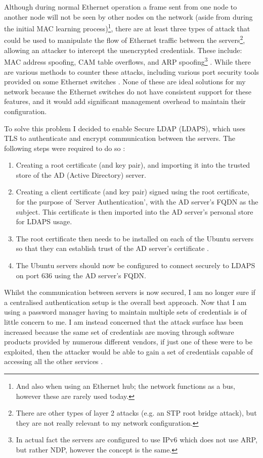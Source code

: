 \documentclass[11pt,a4paper]{scrartcl}
\begin{document}
\begin{refsection}
Although during normal Ethernet operation a frame sent from one node to another node will not be seen by other nodes on the network (aside from during the initial MAC learning process)\footnote{And also when using an Ethernet hub; the network functions as a bus, however these are rarely used today.}, there are at least three types of attack that could be used to manipulate the flow of Ethernet traffic between the servers\footnote{There are other types of layer 2 attacks (e.g. an STP root bridge attack), but they are not really relevant to my network configuration.}, allowing an attacker to intercept the unencrypted credentials.
These include: MAC address spoofing, CAM table overflows, and ARP spoofing\footnote{In actual fact the servers are configured to use IPv6 which does not use ARP, but rather NDP, however the concept is the same.} \cite{l2attacks}.
While there are various methods to counter these attacks, including various port security tools provided on some Ethernet switches \cite[193]{odom_icnd1}.
None of these are ideal solutions for my network because the Ethernet switches do not have consistent support for these features, and it would add significant management overhead to maintain their configuration.

To solve this problem I decided to enable Secure LDAP (LDAPS), which uses TLS to authenticate and encrypt communication between the servers. The following steps were required to do so \cite{microsoft_enable_ldaps, ad_ldaps_gist}:
\begin{enumerate}
	\item Creating a root certificate (and key pair), and importing it into the trusted store of the AD (Active Directory) server.
	\item Creating a client certificate (and key pair) signed using the root certificate, for the purpose of 'Server Authentication', with the AD server's FQDN as the subject. This certificate is then imported into the AD server's personal store for LDAPS usage.
	\item The root certificate then needs to be installed on each of the Ubuntu servers so that they can establish trust of the AD server's certificate \cite{ubuntu_ca_cert}.
	\item The Ubuntu servers should now be configured to connect securely to LDAPS on port 636 using the AD server's FQDN.
\end{enumerate}

Whilst the communication between servers is now secured, I am no longer sure if a centralised authentication setup is the overall best approach. Now that I am using a password manager having to maintain multiple sets of credentials is of little concern to me. I am instead concerned that the attack surface has been increased because the same set of credentials are moving through software products provided by numerous different vendors, if just one of these were to be exploited, then the attacker would be able to gain a set of credentials capable of accessing all the other services \cite{huque_ldap,newington_ldap}.

\printbibliography

\end{refsection}
\end{document}
